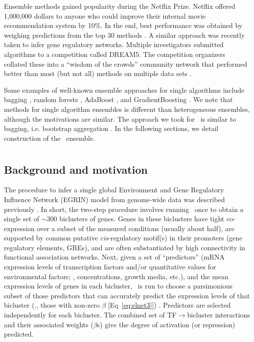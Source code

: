 Ensemble methods gained popularity during the Netflix Prize. Netflix offered 1,000,000 dollars to anyone who could improve their internal movie recommendation system by 10\%. In the end, best performance was obtained by weighing predictions from the top 30 methods \cite{seni_ensemble_2010}. A similar approach was recently taken to infer gene regulatory networks. Multiple investigators submitted algorithms to a competition called DREAM5. The competition organizers collated these into a ``wisdom of the crowds'' community network that performed better than most (but not all) methods on multiple data sets \cite{marbach_wisdom_2012}. 

Some examples of well-known ensemble approaches for single algorithms include bagging \cite{breiman_bagging_1996}, random forests \cite{breiman_random_2001}, AdaBoost \cite{freund_desicion-theoretic_1995}, and GradientBoosting \cite{friedman_greedy_????}. We note that methods for single algorithm ensembles is different than heterogeneous ensembles, although the motivations are similar.  
The approach we took for \egrine\ is similar to bagging, i.e. bootstrap aggregation \cite{breiman_bagging_1996}. In the following sections, we detail construction of the \egrine\ ensemble. 

\section{\egrine}

\subsection{Background and motivation}

The procedure to infer a single global Environment and Gene Regulatory Influence Network (EGRIN) model from genome-wide data was described previously \cite{bonneau_predictive_2007,bonneau_inferelator:_2006,reiss_integrated_2006}. In short, the two-step procedure involves running \cm~once to obtain a single set of $\sim 300$ biclusters of genes. Genes in these biclusters have tight co-expression over a subset of the measured conditions (usually about half), are supported by common putative \textit{cis}-regulatory motif(s) in their promoters (gene regulatory elements, GREs), and are often substantiated by high connectivity in functional association networks. Next, given a set of ``predictors'' (mRNA expression levels of transcription factors and/or quantitative values for environmental factors; \eg, concentrations, growth media, etc.), and the mean expression levels of genes in each bicluster, \nwinf~is run to choose a parsimonious subset of those predictors that can accurately predict the expression levels of that bicluster (\ie., those with non-zero $\beta$ [Eq~\ref{eq:elnet3}]) . Predictors are selected independently for each bicluster. The combined set of TF$\rightarrow$bicluster interactions and their associated weights ($\beta$s) give the degree of activation (or repression) predicted.

